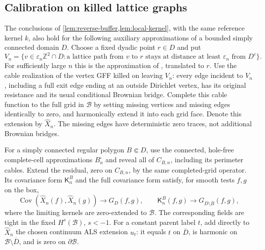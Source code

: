 \subsection{Calibration on killed lattice graphs}

\begin{lemma}
\label{lem:killed-graph-transfer}
The conclusions of \cref{lem:reverse-buffer,lem:local-kernel}, with
the same reference kernel \(k\), also hold for the following auxiliary
approximations of a bounded simply connected domain \(D\).
Choose a fixed dyadic point \(r\in D\) and put
\[
 V_n=\bigl\{v\in\varepsilon_n\mathbb Z^2\cap D:
  \text{a lattice path from \(v\) to \(r\) stays at distance
  at least \(\varepsilon_n\) from \(D^c\)}\bigr\}.
\]
For sufficiently large \(n\) this is the approximation of
\cite[(2.6)]{JLQ2023Fields}, translated to \(r\).
Use the cable realization of the vertex GFF killed on leaving \(V_n\):
every edge incident to \(V_n\), including a full exit edge ending at an
outside Dirichlet vertex, has its original resistance and its usual
conditional Brownian bridge. Complete this cable function to the full
grid in \(\mathcal B\) by setting missing vertices and missing edges
identically to zero, and harmonically extend it into each grid face.
Denote this extension by \(\widehat X_n\). The missing edges have
deterministic zero traces, not additional Brownian bridges.

For a simply connected regular polygon \(B\Subset D\), use the
connected, hole-free complete-cell approximations \(B_n^\square\)
and reveal all of \(C_{B,n}\), including its perimeter cables.
Extend the residual, zero on \(C_{B,n}\), by the same completed-grid
operator. Its covariance form \(\mathsf K_n^B\) and the full covariance
form satisfy, for smooth tests \(f,g\) on the box,
\begin{equation}
 \operatorname{Cov}(\widehat X_n(f),\widehat X_n(g))
       \longrightarrow G_D(f,g),\qquad
 \mathsf K_n^B(f,g)
       \longrightarrow G_{D\setminus\overline B}(f,g),
 \label{eq:killed-graph-green}
\end{equation}
where the limiting kernels are zero-extended to \(\mathcal B\).
The corresponding fields are tight in the fixed \(H^s(\mathcal B)\),
\(s<-1\). For a constant parent label \(t\), add directly to
\(\widehat X_n\) the chosen continuum ALS extension \(u_t\): it equals
\(t\) on \(\overline D\), is harmonic on \(\mathcal B\setminus\overline D\), and is zero on
\(\partial\mathcal B\).
\end{lemma}

